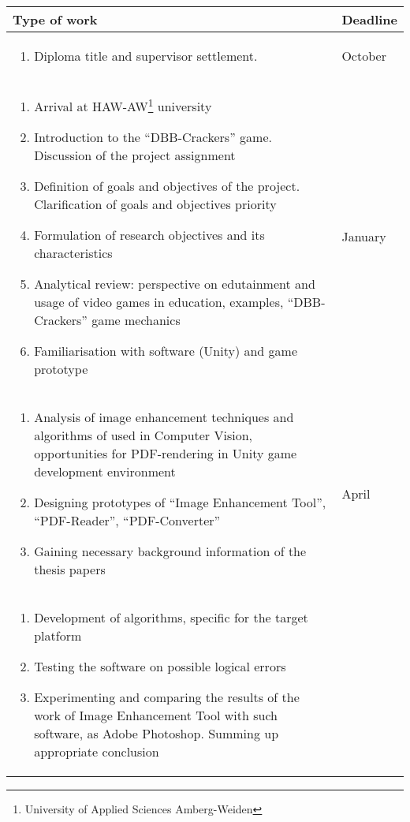 \documentclass[12pt]{article}
\begin{document}
	\begin{centering}
		\begin{longtable}{|p{}|l|}
			\hline
			\textbf{Type of work} & \textbf{Deadline}\\
			\endhead
			\hline
			\begin{enumerate}
				\item Diploma title and supervisor settlement.
			\end{enumerate} &
			October \\
			\hline
			\begin{enumerate}
				\item Arrival at HAW-AW\footnote{University of Applied Sciences Amberg-Weiden} university
				\item Introduction to the ``DBB-Crackers'' game. Discussion of the project assignment
				\item Definition of goals and objectives of the project. Clarification of goals and objectives priority
				\item Formulation of research objectives and its characteristics
				\item Analytical review: perspective on edutainment and usage of video games in education, examples, ``DBB-Crackers'' game mechanics
				\item Familiarisation with software (Unity) and game prototype
			\end{enumerate}
			& January \\
			\hline
			\begin{enumerate}
				\item Analysis of image enhancement techniques and algorithms of used in Computer Vision, opportunities for PDF-rendering in Unity game development environment
				\item Designing prototypes of ``Image Enhancement Tool'', ``PDF-Reader'', ``PDF-Converter''
				\item Gaining necessary background information of the thesis papers
			\end{enumerate}
			& April \\
			\hline
			\begin{enumerate}
				\item Development of algorithms, specific for the target platform
				\item Testing the software on possible logical errors
				\item Experimenting and comparing the results of the work of Image Enhancement Tool with such software, as Adobe Photoshop. Summing up appropriate conclusion

\end{enumerate}
\end{longtable}
\end{centering}
\end{document}
